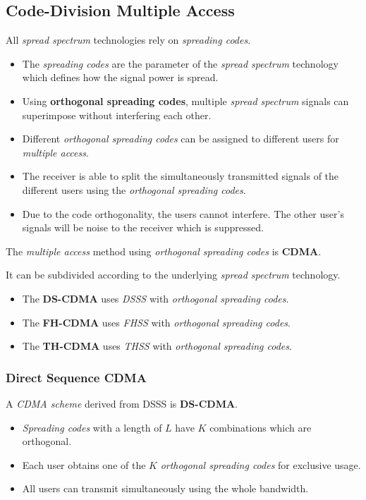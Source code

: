 \begin{refsection}
\subsection{Code-Division Multiple Access}

All \emph{spread spectrum} technologies rely on \emph{spreading codes}.
\begin{itemize}
	\item The \emph{spreading codes} are the parameter of the \emph{spread spectrum} technology which defines how the signal power is spread.
	\item Using  \textbf{orthogonal spreading codes}, multiple \emph{spread spectrum} signals can superimpose without interfering each other.
	\item Different \emph{orthogonal spreading codes} can be assigned to different users for \emph{multiple access}.
	\item The receiver is able to split the simultaneously transmitted signals of the different users using the \emph{orthogonal spreading codes}.
	\item Due to the code orthogonality, the users cannot interfere. The other user's signals will be noise to the receiver which is suppressed.
\end{itemize}

The \emph{multiple access} method using \emph{orthogonal spreading codes} is  \textbf{\acf{CDMA}}.

It can be subdivided according to the underlying \emph{spread spectrum} technology.
\begin{itemize}
	\item The \textbf{\acf{DS-CDMA}} uses \emph{\acf{DSSS}} with \emph{orthogonal spreading codes}.
	\item The \textbf{\acf{FH-CDMA}} uses \emph{\acf{FHSS}} with \emph{orthogonal spreading codes}.
	\item The \textbf{\acf{TH-CDMA}} uses \emph{\acf{THSS}} with \emph{orthogonal spreading codes}.
\end{itemize}

\subsubsection{Direct Sequence CDMA}

A \emph{\ac{CDMA} scheme} derived from \ac{DSSS} is  \textbf{\acf{DS-CDMA}}.
\begin{itemize}
	\item \emph{Spreading codes} with a length of $L$ have $K$ combinations which are orthogonal.
	\item Each user obtains one of the $K$ \emph{orthogonal spreading codes} for exclusive usage.
	\item All users can transmit simultaneously using the whole bandwidth.
\end{itemize}


\end{refsection}
